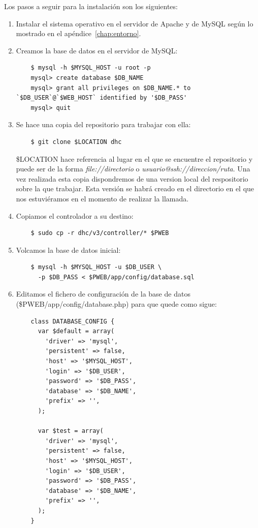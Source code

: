 Los pasos a seguir para la instalación son los siguientes:

\begin{enumerate}
	\item Instalar el sistema operativo en el servidor de Apache y de MySQL según lo mostrado en el apéndice~\ref{chap:entorno}.
	
	\item Creamos la base de datos en el servidor de MySQL:
	
	\begin{verbatim}
	$ mysql -h $MYSQL_HOST -u root -p
	mysql> create database $DB_NAME
	mysql> grant all privileges on $DB_NAME.* to `$DB_USER`@`$WEB_HOST` identified by '$DB_PASS'
	mysql> quit
	\end{verbatim}

	\item Se hace una copia del repositorio para trabajar con ella:
	
	\begin{verbatim}
	$ git clone $LOCATION dhc
	\end{verbatim}
	
	\$LOCATION hace referencia al lugar en el que se encuentre el repositorio y puede ser de la forma \emph{file://directorio} o \emph{usuario@ssh://direccion/ruta}. Una vez realizada esta copia dispondremos de una version local del respositorio sobre la que trabajar. Esta versión se habrá creado en el directorio en el que nos estuviéramos en el momento de realizar la llamada.

	\item Copiamos el controlador a su destino:
	
	\begin{verbatim}
	$ sudo cp -r dhc/v3/controller/* $PWEB
	\end{verbatim}
	
	\item Volcamos la base de datos inicial:
	
	\begin{verbatim}
	$ mysql -h $MYSQL_HOST -u $DB_USER \
	  -p $DB_PASS < $PWEB/app/config/database.sql
	\end{verbatim}
	
	\item Editamos el fichero de configuración de la base de datos (\$PWEB/app/config/database.php) para que quede como sigue:
	
	\begin{verbatim}
	class DATABASE_CONFIG {
	  var $default = array(
	    'driver' => 'mysql',
	    'persistent' => false,
	    'host' => '$MYSQL_HOST',
	    'login' => '$DB_USER',
	    'password' => '$DB_PASS',
	    'database' => '$DB_NAME',
	    'prefix' => '',
	  );

	  var $test = array(
	    'driver' => 'mysql',
	    'persistent' => false,
	    'host' => '$MYSQL_HOST',
	    'login' => '$DB_USER',
	    'password' => '$DB_PASS',
	    'database' => '$DB_NAME',
	    'prefix' => '',
	  );
	}
	\end{verbatim}
\end{enumerate}	


